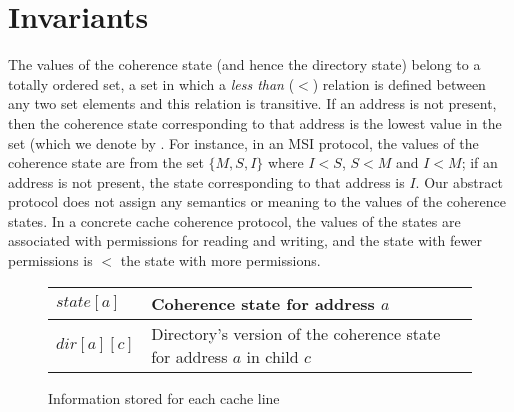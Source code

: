 \section{Invariants}
\label{sec:invariants}

\newcommand{\threeAngle}[4]{\text{$#1\langle#2,#3,#4\rangle$}}

\newcommand{\Req}[3]{\threeAngle{Req}{#1}{#2}{#3}}
\newcommand{\Resp}[3]{\threeAngle{Resp}{#1}{#2}{#3}}
\newcommand{\Inv}{\text{$Inv$\;}}

The values of the coherence state (and hence the directory state) belong to a
totally ordered set, \ie a set in which a \emph{less than} ($<$) relation is
defined between any two set elements and this relation is transitive. If an
address is not present, then the coherence state corresponding to that address
is the lowest value in the set (which we denote by \Inv. For instance, in an
MSI protocol, the values of the coherence state are from the set $\{M, S, I\}$
where $I < S$, $S < M$ and $I < M$; if an address is not present, the state
corresponding to that address is $I$. Our abstract protocol does not assign any
semantics or meaning to the values of the coherence states. In a concrete cache
coherence protocol, the values of the states are associated with permissions
for reading and writing, and the state with fewer permissions is $<$ the state
with more permissions.

\begin{figure}\centering
\begin{tabularx}{\linewidth}{|l|X|}
\hline
$state[a]$ & Coherence state for address $a$\\
\hline
$dir[a][c]$ & Directory's version of the coherence state for address $a$ in child
$c$\\
\hline
\end{tabularx}
\caption{Information stored for each cache line}
\label{table:storage}
\end{figure}

